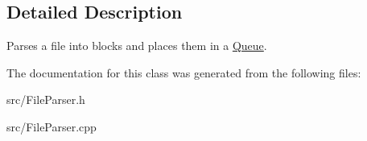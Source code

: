 \subsection{Detailed Description}
Parses a file into blocks and places them in a \hyperlink{class_queue}{Queue}. 

The documentation for this class was generated from the following files\+:\begin{DoxyCompactItemize}
\item 
src/File\+Parser.\+h\item 
src/File\+Parser.\+cpp\end{DoxyCompactItemize}
